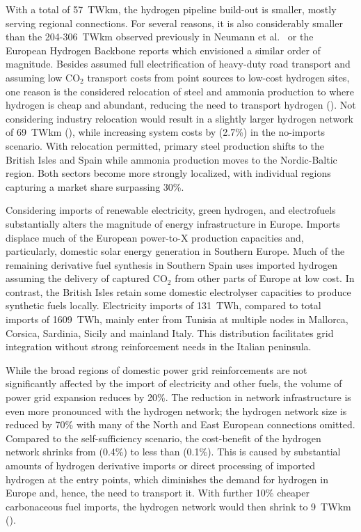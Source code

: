
With a total of 57~TWkm, the hydrogen pipeline build-out is smaller, mostly
serving regional connections. For several reasons, it is also considerably
smaller than the 204-306~TWkm observed previously in Neumann et
al.~\cite{neumannPotentialRoleHydrogen2023} or the European Hydrogen Backbone
reports\cite{gasforclimateEuropeanHydrogen2022} which envisioned a similar order
of magnitude. Besides assumed full electrification of heavy-duty road
transport\cite{} and assuming low CO$_2$ transport costs from point sources to
low-cost hydrogen sites,\cite{hofmannH2CO2Network2024} one reason is the
considered relocation of steel and ammonia production to where hydrogen is cheap
and abundant, reducing the need to transport hydrogen
(). Not considering industry relocation would result
in a slightly larger hydrogen network of 69~TWkm (),
while increasing system costs by  (2.7\%) in the no-imports scenario.
With relocation permitted, primary steel production shifts to the British Isles
and Spain while ammonia production moves to the Nordic-Baltic region. Both
sectors become more strongly localized, with individual regions capturing a
market share surpassing 30\%.


Considering imports of renewable electricity, green hydrogen, and electrofuels
substantially alters the magnitude of energy infrastructure in Europe. Imports
displace much of the European power-to-X production capacities and,
particularly, domestic solar energy generation in Southern Europe. Much of the
remaining derivative fuel synthesis in Southern Spain uses imported hydrogen
assuming the delivery of captured CO$_2$ from other parts of Europe at low
cost.\cite{hofmannH2CO2Network2024} In contrast, the British Isles retain some
domestic electrolyser capacities to produce synthetic fuels locally. Electricity
imports of 131~TWh, compared to total imports of 1609~TWh, mainly enter from
Tunisia at multiple nodes in Mallorca, Corsica, Sardinia, Sicily and mainland
Italy. This distribution facilitates grid integration without strong
reinforcement needs in the Italian peninsula.

While the broad regions of domestic power grid reinforcements are not
significantly affected by the import of electricity and other fuels, the volume
of power grid expansion reduces by 20\%. The reduction in network infrastructure
is even more pronounced with the hydrogen network; the hydrogen network size is
reduced by 70\% with many of the North and East European connections omitted.
Compared to the self-sufficiency scenario, the cost-benefit of the hydrogen
network shrinks from  (0.4\%) to less than  (0.1\%). This is
caused by substantial amounts of hydrogen derivative imports or direct
processing of imported hydrogen at the entry points, which diminishes the demand
for hydrogen in Europe and, hence, the need to transport it. With further 10\%
cheaper carbonaceous fuel imports, the hydrogen network would then shrink to
9~TWkm ().

